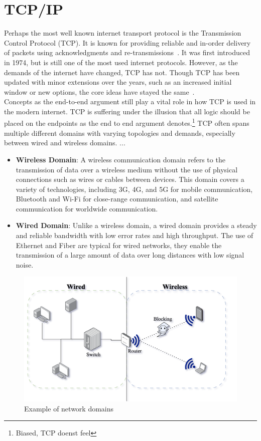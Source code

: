 \documentclass[a4paper,english, 11pt]{report}
\begin{document}
\section{TCP/IP}
Perhaps the most well known internet transport protocol is the Transmission Control Protocol (TCP). It is known for providing reliable and in-order delivery of packets using acknowledgments and re-transmissions~\cite{Eddy_2022}. It was first introduced in 1974, but is still one of the most used internet protocols. However, as the demands of the internet have changed, TCP has not. Though TCP has been updated with minor extensions over the years, such as an increased initial window or new options, the core ideas have stayed the same~\cite{rfc8803}.\\

Concepts as the end-to-end argument still play a vital role in how TCP is used in the modern internet. TCP is suffering under the illusion that all logic should be placed on the endpoints as the end to end argument denotes.\footnote{Biased, TCP doenst feel} TCP often spans multiple different domains with varying topologies and demands, especially between wired and wireless domains. ...
\begin{itemize}
  \item \textbf{Wireless Domain}: A wireless communication domain refers to the transmission of data over a wireless medium without the use of physical connections such as wires or cables between devices. This domain covers a variety of technologies, including 3G, 4G, and 5G for mobile communication, Bluetooth and Wi-Fi for close-range communication, and satellite communication for worldwide communication.
  \item \textbf{Wired Domain}: Unlike a wireless domain, a wired domain provides a steady and reliable bandwidth with low error rates and high throughput. The use of Ethernet and Fiber are typical for wired networks, they enable the transmission of a large amount of data over long distances with low signal noise. 
\end{itemize}

\begin{figure}[h] %
	\centering
	\includegraphics[scale=0.65]{../diagrams/drawio/domains.png}
  	\caption{Example of network domains}
  	\label{fig:domains}
\end{figure}
\end{document}

